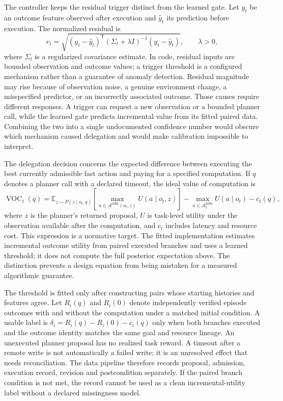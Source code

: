 \documentclass[11pt]{article}
\begin{document}
The controller keeps the residual trigger distinct from the learned gate. Let $y_t$ be an outcome feature observed after execution and $\hat{y}_t$ its prediction before execution. The normalized residual is
\begin{equation}
r_t=\sqrt{(y_t-\hat{y}_t)^{\mathsf T}(\Sigma_t+\lambda I)^{-1}(y_t-\hat{y}_t)},\qquad \lambda>0,
\end{equation}
where $\Sigma_t$ is a regularized covariance estimate. In code, residual inputs are bounded observation and outcome values; a trigger threshold is a configured mechanism rather than a guarantee of anomaly detection. Residual magnitude may rise because of observation noise, a genuine environment change, a misspecified predictor, or an incorrectly associated outcome. Those causes require different responses. A trigger can request a new observation or a bounded planner call, while the learned gate predicts incremental value from its fitted paired data. Combining the two into a single undocumented confidence number would obscure which mechanism caused delegation and would make calibration impossible to interpret.

The delegation decision concerns the expected difference between executing the best currently admissible fast action and paying for a specified computation. If $q$ denotes a planner call with a declared timeout, the ideal value of computation is
\begin{equation}
\operatorname{VOC}_t(q)=\mathbb{E}_{z\sim P(z\mid o_t,q)}\left[\max_{a\in\mathcal{A}^{\mathrm{adm}}(o_t,z)}U(a\mid o_t,z)\right]
 -\max_{a\in\mathcal{A}^{\mathrm{adm}}_t}U(a\mid o_t)-c_t(q),
\end{equation}
where $z$ is the planner's returned proposal, $U$ is task-level utility under the observation available after the computation, and $c_t$ includes latency and resource cost. This expression is a normative target. The fitted implementation estimates incremental outcome utility from paired executed branches and uses a learned threshold; it does not compute the full posterior expectation above. The distinction prevents a design equation from being mistaken for a measured algorithmic guarantee.

The threshold is fitted only after constructing pairs whose starting histories and features agree. Let $R_i(q)$ and $R_i(0)$ denote independently verified episode outcomes with and without the computation under a matched initial condition. A usable label is $\delta_i=R_i(q)-R_i(0)-c_i(q)$ only when both branches executed and the outcome identity matches the same goal and resource lineage. An unexecuted planner proposal has no realized task reward. A timeout after a remote write is not automatically a failed write; it is an unresolved effect that needs reconciliation. The data pipeline therefore records proposal, admission, execution record, revision and postcondition separately. If the paired branch condition is not met, the record cannot be used as a clean incremental-utility label without a declared missingness model.
\end{document}
